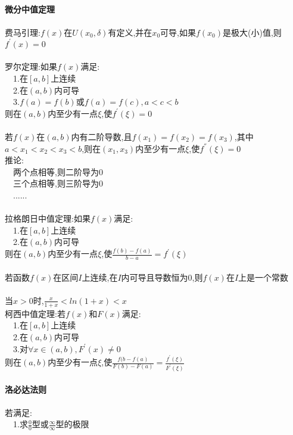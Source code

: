 \documentclass{article}
\begin{document}
\begin{flushleft}
	\fontsize{24pt}{30pt}\selectfont
	~\\ \textbf{微分中值定理} \\~\\
	费马引理:$f(x)$在$U(x_0,\delta)$有定义,并在$x_0$可导,如果$f(x_0)$是极大(小)值,则$f^{'}(x)=0$\\
	~\\
	罗尔定理:如果$f(x)$满足:\\
	\ \ 1.在$[a,b]$上连续\\
	\ \ 2.在$(a,b)$内可导\\
	\ \ 3.$f(a)=f(b)$或$f(a)=f(c), a<c<b$\\
	则在$(a,b)$内至少有一点$\xi$,使$f^{'}(\xi)=0$\\
	~\\
	若$f(x)$在$(a,b)$内有二阶导数,且$f(x_1)=f(x_2)=f(x_3)$,其中$a<x_1<x_2<x_3<b$,则在$(x_1,x_3)$内至少有一点$\xi$,使$f^{''}(\xi)=0$\\
	推论:\\
	\ \ 两个点相等,则二阶导为0\\
	\ \ 三个点相等,则三阶导为0\\
	\ \ ......\\
	~\\
	拉格朗日中值定理:如果$f(x)$满足:\\
	\ \ 1.在$[a,b]$上连续\\
	\ \ 2.在$(a,b)$内可导\\
	则在$(a,b)$内至少有一点$\xi$,使$\frac{f(b)-f(a)}{b-a}=f^{'}(\xi)$\\
	~\\
	若函数$f(x)$在区间$I$上连续,在$I$内可导且导数恒为0,则$f(x)$在$I$上是一个常数\\
	~\\
	当$x>0$时,$\frac{x}{1+x}<ln(1+x)<x$\\
	柯西中值定理:若$f(x)$和$F(x)$满足:\\
	\ \ 1.在$[a,b]$上连续\\
	\ \ 2.在$(a,b)$内可导\\
	\ \ 3.对$\forall x\in (a,b),F^{'}(x)\neq 0$\\
	则在$(a,b)$内至少有一点$\xi$,使$\frac{f(b-f(a)}{F(b)-F(a)}=\frac{f^{'}(\xi)}{F^{'}(\xi)}$\\
	~\\ \textbf{洛必达法则} \\~\\
	若满足:\\
	\ \ 1.求$\frac{0}{0}$型或$\frac{\infty}{\infty}$型的极限\\

\end{flushleft}
\end{document}
